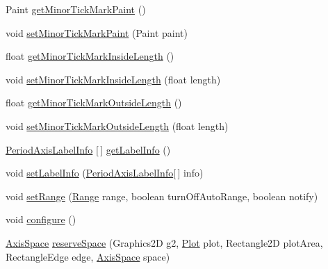\begin{DoxyCompactItemize}
Paint \mbox{\hyperlink{classorg_1_1jfree_1_1chart_1_1axis_1_1_period_axis_a6cde1e2037576229089839edbd508c03}{get\+Minor\+Tick\+Mark\+Paint}} ()
\item 
void \mbox{\hyperlink{classorg_1_1jfree_1_1chart_1_1axis_1_1_period_axis_aa8237a585dbae1cc850698c9053b76ef}{set\+Minor\+Tick\+Mark\+Paint}} (Paint paint)
\item 
float \mbox{\hyperlink{classorg_1_1jfree_1_1chart_1_1axis_1_1_period_axis_a6abbb2f17556fa5ed28a373766abcee2}{get\+Minor\+Tick\+Mark\+Inside\+Length}} ()
\item 
void \mbox{\hyperlink{classorg_1_1jfree_1_1chart_1_1axis_1_1_period_axis_ac6c213677336286033404a82d6db11d3}{set\+Minor\+Tick\+Mark\+Inside\+Length}} (float length)
\item 
float \mbox{\hyperlink{classorg_1_1jfree_1_1chart_1_1axis_1_1_period_axis_a84418baa766c4c7746ce562ba74a479e}{get\+Minor\+Tick\+Mark\+Outside\+Length}} ()
\item 
void \mbox{\hyperlink{classorg_1_1jfree_1_1chart_1_1axis_1_1_period_axis_a196d47bde6bc406c52e7a3a5f84e341f}{set\+Minor\+Tick\+Mark\+Outside\+Length}} (float length)
\item 
\mbox{\hyperlink{classorg_1_1jfree_1_1chart_1_1axis_1_1_period_axis_label_info}{Period\+Axis\+Label\+Info}} \mbox{[}$\,$\mbox{]} \mbox{\hyperlink{classorg_1_1jfree_1_1chart_1_1axis_1_1_period_axis_a539a0057f3eb84813bd6ac2011fd65d3}{get\+Label\+Info}} ()
\item 
void \mbox{\hyperlink{classorg_1_1jfree_1_1chart_1_1axis_1_1_period_axis_aa8eb231afbaa38447b96f2b31ea58321}{set\+Label\+Info}} (\mbox{\hyperlink{classorg_1_1jfree_1_1chart_1_1axis_1_1_period_axis_label_info}{Period\+Axis\+Label\+Info}}\mbox{[}$\,$\mbox{]} info)
\item 
void \mbox{\hyperlink{classorg_1_1jfree_1_1chart_1_1axis_1_1_period_axis_a764a078dbc8532b2d889aa45f6e60903}{set\+Range}} (\mbox{\hyperlink{classorg_1_1jfree_1_1data_1_1_range}{Range}} range, boolean turn\+Off\+Auto\+Range, boolean notify)
\item 
void \mbox{\hyperlink{classorg_1_1jfree_1_1chart_1_1axis_1_1_period_axis_af49bf2315554aa56607fc4cb2e00997f}{configure}} ()
\item 
\mbox{\hyperlink{classorg_1_1jfree_1_1chart_1_1axis_1_1_axis_space}{Axis\+Space}} \mbox{\hyperlink{classorg_1_1jfree_1_1chart_1_1axis_1_1_period_axis_ae5f88c60869d23eb7851fd7101ca08d5}{reserve\+Space}} (Graphics2D g2, \mbox{\hyperlink{classorg_1_1jfree_1_1chart_1_1plot_1_1_plot}{Plot}} plot, Rectangle2D plot\+Area, Rectangle\+Edge edge, \mbox{\hyperlink{classorg_1_1jfree_1_1chart_1_1axis_1_1_axis_space}{Axis\+Space}} space)

\end{DoxyCompactItemize}
